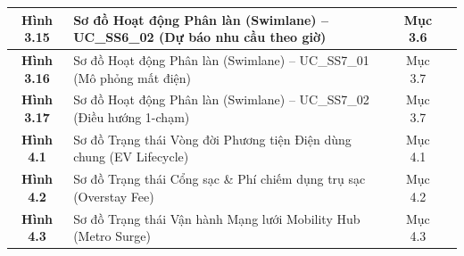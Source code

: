 \documentclass[12pt,a4paper]{article}
\begin{document}
\begin{longtable}{|c|p{8.5cm}|c|c|}
    \textbf{Hình 3.15} & Sơ đồ Hoạt động Phân làn (Swimlane) -- UC\_SS6\_02 (Dự báo nhu cầu theo giờ) & Mục 3.6 & \pageref{fig:act-ss6-02} \\
    \hline
    \textbf{Hình 3.16} & Sơ đồ Hoạt động Phân làn (Swimlane) -- UC\_SS7\_01 (Mô phỏng mất điện) & Mục 3.7 & \pageref{fig:act-ss7-01} \\
    \hline
    \textbf{Hình 3.17} & Sơ đồ Hoạt động Phân làn (Swimlane) -- UC\_SS7\_02 (Điều hướng 1-chạm) & Mục 3.7 & \pageref{fig:act-ss7-02} \\
    \hline
    \textbf{Hình 4.1} & Sơ đồ Trạng thái Vòng đời Phương tiện Điện dùng chung (EV Lifecycle) & Mục 4.1 & \pageref{fig:state-ev} \\
    \hline
    \textbf{Hình 4.2} & Sơ đồ Trạng thái Cổng sạc \& Phí chiếm dụng trụ sạc (Overstay Fee) & Mục 4.2 & \pageref{fig:state-charging} \\
    \hline
    \textbf{Hình 4.3} & Sơ đồ Trạng thái Vận hành Mạng lưới Mobility Hub (Metro Surge) & Mục 4.3 & \pageref{fig:state-hub} \\
    \hline
\end{longtable}

\vspace{0.4cm}
\end{document}

